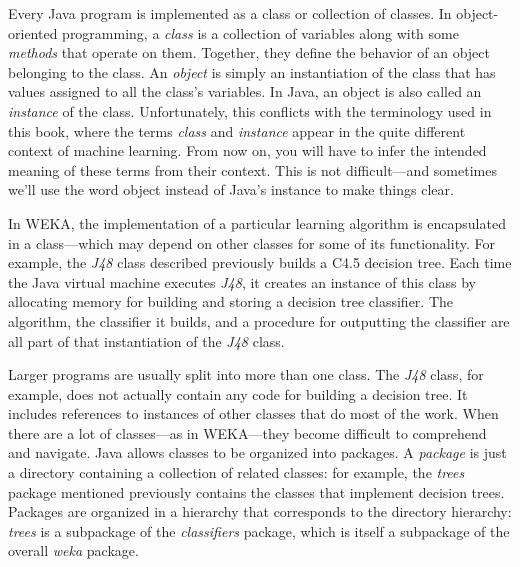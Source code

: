 Every Java program is implemented as a class or collection of
classes. In object-oriented programming, a \textit{class} is a
collection of variables along with some \textit{methods} that operate
on them. Together, they define the behavior of an object belonging to
the class. An \textit{object} is simply an instantiation of the class
that has values assigned to all the class's variables. In Java, an
object is also called an \textit{instance} of the
class. Unfortunately, this conflicts with the terminology used in this
book, where the terms \textit{class} and \textit{instance} appear in
the quite different context of machine learning. From now on, you will
have to infer the intended meaning of these terms from their
context. This is not difficult---and sometimes we'll use the word object
instead of Java's instance to make things clear.

In WEKA, the implementation of a particular learning algorithm is
encapsulated in a class---which may depend on other classes for some
of its functionality. For example, the \textit{J48} class described
previously builds a C4.5 decision tree. Each time the Java virtual
machine executes \textit{J48}, it creates an instance of this class by
allocating memory for building and storing a decision tree
classifier. The algorithm, the classifier it builds, and a procedure
for outputting the classifier are all part of that instantiation of
the \textit{J48} class.

Larger programs are usually split into more than one class. The
\textit{J48} class, for example, does not actually contain any code
for building a decision tree. It includes references to instances of
other classes that do most of the work. When there are a lot of
classes---as in WEKA---they become difficult to comprehend and
navigate. Java allows classes to be organized into packages. A
\textit{package} is just a directory containing a collection of
related classes: for example, the \textit{trees} package mentioned
previously contains the classes that implement decision
trees. Packages are organized in a hierarchy that corresponds to the
directory hierarchy: \textit{trees} is a subpackage of the
\textit{classifiers} package, which is itself a subpackage of the
overall \textit{weka} package.


